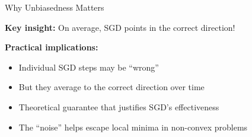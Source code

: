 \documentclass[usenames,dvipsnames]{beamer}
\newcommand{\E}{\mathbb{E}}
\begin{document}



  \begin{frame}{Why Unbiasedness Matters}
    \begin{keypointsbox}{}
    \textbf{Key insight:} On average, SGD points in the correct direction!
    \end{keypointsbox}
    
    \pause
    \textbf{Practical implications:}
    \begin{itemize}[<+->]
        \item Individual SGD steps may be ``wrong''
        \item But they average to the correct direction over time
        \item Theoretical guarantee that justifies SGD's effectiveness
        \item The ``noise'' helps escape local minima in non-convex problems
    \end{itemize}
  \end{frame}
\end{document}
